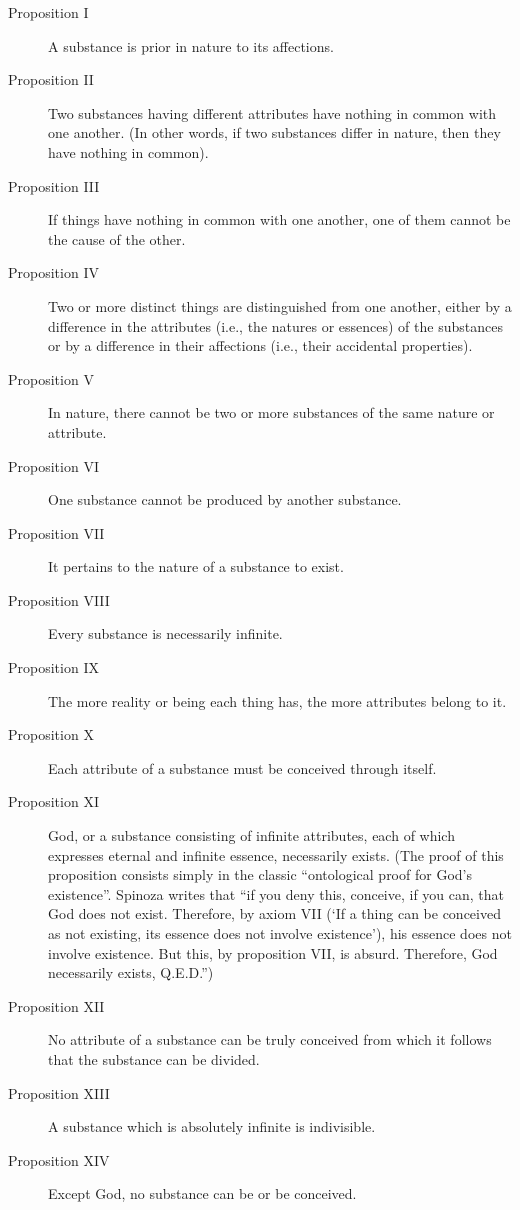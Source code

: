 \documentclass[12pt,letterpaper]{article}
\begin{document}
\begin{spacing}{2}
        \begin{description}
            \item[Proposition I] A substance is prior in nature to its affections.
            \item[Proposition II] Two substances having different attributes
                have nothing in common with one another. (In other words, if
                two substances differ in nature, then they have nothing in
                common).
            \item[Proposition III] If things have nothing in common with one
                another, one of them cannot be the cause of the other.
            \item[Proposition IV] Two or more distinct things are distinguished
                from one another, either by a difference in the attributes
                (i.e., the natures or essences) of the substances or by a
                difference in their affections (i.e., their accidental
                properties).
            \item[Proposition V] In nature, there cannot be two or more
                substances of the same nature or attribute.
            \item[Proposition VI] One substance cannot be produced by another
                substance.
            \item[Proposition VII] It pertains to the nature of a substance to
                exist.
            \item[Proposition VIII] Every substance is necessarily infinite.
            \item[Proposition IX] The more reality or being each thing has,
                the more attributes belong to it.
            \item[Proposition X] Each attribute of a substance must be
                conceived through itself.
            \item[Proposition XI] God, or a substance consisting of infinite
                attributes, each of which expresses eternal and infinite
                essence, necessarily exists. (The proof of this proposition
                consists simply in the classic ``ontological proof for God’s
                existence''. Spinoza writes that ``if you deny this, conceive,
                if you can, that God does not exist. Therefore, by axiom VII
                (`If a thing can be conceived as not existing, its essence
                does not involve existence'), his essence does not involve
                existence. But this, by proposition VII, is absurd. Therefore,
                God necessarily exists, Q.E.D.'')
            \item[Proposition XII] No attribute of a substance can be truly
                conceived from which it follows that the substance can be
                divided.
            \item[Proposition XIII] A substance which is absolutely infinite
                is indivisible.
            \item[Proposition XIV] Except God, no substance can be or be
                conceived.
        \end{description}


\end{spacing}
\end{document}
